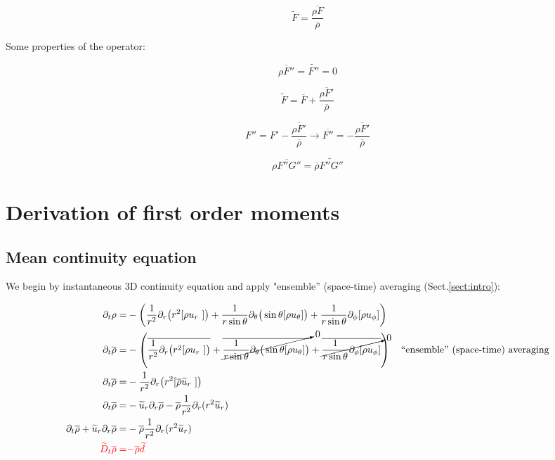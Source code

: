 \documentclass[10pt,paper=a4]{report}
\newcommand{\eht}{\overline}
\newcommand{\fht}{\widetilde}
\begin{document}
\begin{equation}
\fht{F} = \frac{\eht{\rho F}}{\eht{\rho}}
\end{equation}

\noindent
Some properties of the operator: 

\begin{equation}
\eht{\rho F''} = \fht{F''} = 0
\end{equation}

\begin{equation}
\fht{F} = \eht{F} + \frac{\eht{\rho F'}}{\eht{\rho}} 
\end{equation}

\begin{equation}
F'' = F' - \frac{\eht{\rho F'}}{\eht{\rho}} \rightarrow \eht{F''} = -\frac{\eht{\rho F'}}{\eht{\rho}}
\end{equation}

\begin{equation}
\eht{\rho F''G''} = \eht{\rho}\fht{F''G''}
\end{equation}

\newpage

\section{Derivation of first order moments}

\subsection{Mean continuity equation}

We begin by instantaneous 3D continuity equation and apply "ensemble'' (space-time) averaging (Sect.\ref{sect:intro}):

\fontsize{9pt}{20pt}

\begin{align}
\partial_{t} \rho = & - \left( \frac{1}{r^{2}}\partial_{r}\big(r^{2}[\rho u_{r}~]\big) + \frac{1}{r\sin{\theta}}\partial_{\theta} \big(\sin{\theta} [\rho u_{\theta}]\big) + \frac{1}{r\sin{\theta}}\partial_{\phi} [\rho u_{\phi}] \right) \\
\partial_{t} \eht{\rho} = & -\left( \eht{\frac{1}{r^{2}}\partial_{r}\big(r^{2}[\rho u_{r}~]\big)} + \cancelto{0}{\eht{\frac{1}{r\sin{\theta}}\partial_{\theta} \big(\sin{\theta} [\rho u_{\theta}]\big)}} + \cancelto{0}{\eht{\frac{1}{r\sin{\theta}}\partial_{\phi} [\rho u_{\phi}]}} \right) \ \ \ \mbox{``ensemble'' (space-time) averaging} \\
\partial_t \eht{\rho} = & -\frac{1}{r^{2}}\partial_{r}\big(r^{2}[\eht{\rho} \fht{u}_{r}~]\big) \\
\partial_t \eht{\rho} = & -\fht{u}_r \partial_r \eht{\rho} -\eht{\rho} \frac{1}{r^{2}}\partial_{r} (r^2 \fht{u}_r) \\
\partial_t \eht{\rho} + \fht{u}_r \partial_r \eht{\rho} = & -\eht{\rho}\frac{1}{r^{2}}\partial_{r} (r^2 \fht{u}_r) \\
{\color{red} \fht{D}_t \eht{\rho} =} & {\color{red} -\eht{\rho} \fht{d}}
\end{align}
\end{document}
